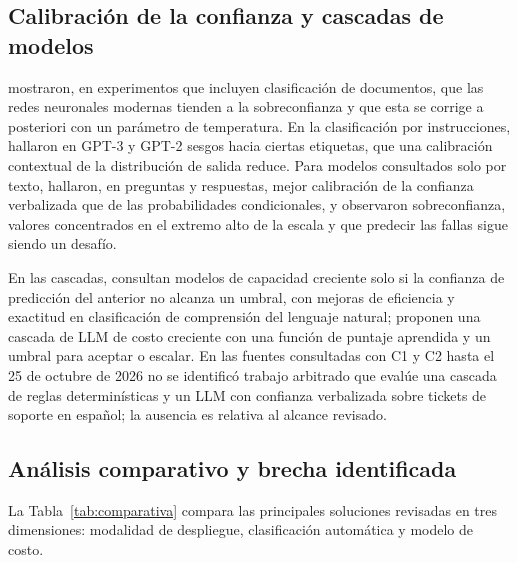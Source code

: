 \subsection{Calibración de la confianza y cascadas de modelos}\label{subsec:calibracion-cascadas}

\textcite{Guo2017_calibration} mostraron, en experimentos que incluyen clasificación de documentos, que las redes neuronales modernas tienden a la sobreconfianza y que esta se corrige a posteriori con un parámetro de temperatura. En la clasificación por instrucciones, \textcite{Zhao2021_calibrate_before_use} hallaron en GPT-3 y GPT-2 sesgos hacia ciertas etiquetas, que una calibración contextual de la distribución de salida reduce. Para modelos consultados solo por texto, \textcite{Tian2023_verbalized_confidence} hallaron, en preguntas y respuestas, mejor calibración de la confianza verbalizada que de las probabilidades condicionales, y \textcite{Xiong2024_confidence_elicitation} observaron sobreconfianza, valores concentrados en el extremo alto de la escala y que predecir las fallas sigue siendo un desafío.

En las cascadas, \textcite{Varshney2022_model_cascading} consultan modelos de capacidad creciente solo si la confianza de predicción del anterior no alcanza un umbral, con mejoras de eficiencia y exactitud en clasificación de comprensión del lenguaje natural; \textcite{Chen2024_frugalgpt} proponen una cascada de LLM de costo creciente con una función de puntaje aprendida y un umbral para aceptar o escalar. En las fuentes consultadas con C1 y C2 hasta el 25 de octubre de 2026 no se identificó trabajo arbitrado que evalúe una cascada de reglas determinísticas y un LLM con confianza verbalizada sobre tickets de soporte en español; la ausencia es relativa al alcance revisado.

\subsection{Análisis comparativo y brecha identificada}\label{subsec:analisis-comparativo}

La Tabla~\ref{tab:comparativa} compara las principales soluciones revisadas en tres dimensiones: modalidad de despliegue, clasificación automática y modelo de costo.

